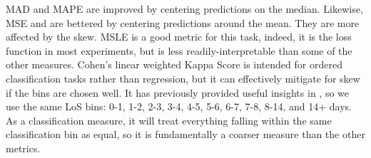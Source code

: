 \documentclass[sigconf]{acmart}
\begin{document}
MAD and MAPE are improved by centering predictions on the median. Likewise, MSE and  are bettered by centering predictions around the mean. They are more affected by the skew. MSLE is a good metric for this task, indeed, it is the loss function in most experiments, but is less readily-interpretable than some of the other measures. Cohen's linear weighted Kappa Score \citep{doi:10.1177/001316446002000104} is intended for ordered classification tasks rather than regression, but it can effectively mitigate for skew if the bins are chosen well. It has previously provided useful insights in \citet{harutyunyan}, so we use the same LoS bins: 0-1, 1-2, 2-3, 3-4, 4-5, 5-6, 6-7, 7-8, 8-14, and 14+ days. As a classification measure, it will treat everything falling within the same classification bin as equal, so it is fundamentally a coarser measure than the other metrics.
\end{document}
